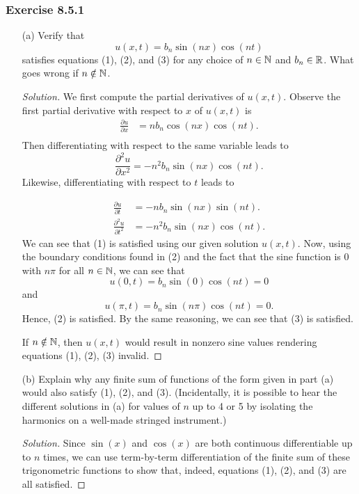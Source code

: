 \subsubsection{Exercise 8.5.1} 
\begin{enumerate}
    \item[(a)] Verify that 
        \[  u(x,t) = b_{n} \sin(nx) \cos(nt) \] satisfies equations (1), (2), and (3) for any choice of \( n \in \mathbb{N}  \) and \( b_{n} \in \mathbb{R}  \). What goes wrong if \( n \notin \mathbb{N}  \).
        \begin{proof}[Solution]
        We first compute the partial derivatives of \( u(x,t)  \). Observe the first partial derivative with respect to \( x  \) of \( u(x,t) \) is 
        \begin{align*}
            \frac{\partial u }{\partial x } &= n b_{n} \cos(nx) \cos(nt). \\
        \end{align*}
        Then differentiating with respect to the same variable leads to 
        \[  \frac{\partial ^{2} u  }{\partial x^{2} } = - n^{2} b_{n} \sin(nx) \cos(nt).  \] 
        Likewise, differentiating with respect to \( t  \) leads to 

        \begin{align*}
            \frac{\partial u }{\partial t } &= -n b_{n} \sin(nx) \sin(nt). \\
            \frac{\partial ^{2} u  }{\partial  t^{2} } &= - n^{2} b_{n} \sin(nx) \cos(nt).
        \end{align*}
        We can see that (1) is satisfied using our given solution \( u(x,t) \).
        Now, using the boundary conditions found in (2) and the fact that the sine function is 0 with \( n \pi  \) for all \( n \in \mathbb{N}  \), we can see that 
        \[  u(0,t) =  b_{n} \sin(0) \cos(nt) = 0  \]
        and 
        \[  u(\pi, t ) = b_{n} \sin(n \pi ) \cos(nt) = 0. \] Hence, (2) is satisfied. By the same reasoning, we can see that (3) is satisfied.

        If \( n \notin \mathbb{N} \), then \( u(x,t)  \) would result in nonzero sine values rendering equations (1), (2), (3) invalid.
        \end{proof}
    \item[(b)] Explain why any finite sum of functions of the form given in part (a) would also satisfy (1), (2), and (3). (Incidentally, it is possible to hear the different solutions in (a) for values of \( n  \) up to 4 or 5 by isolating the harmonics on a well-made stringed instrument.)
        \begin{proof}[Solution]
        Since \( \sin(x) \) and \( \cos(x) \) are both continuous differentiable up to \( n  \) times, we can use term-by-term differentiation of the finite sum of these trigonometric functions to show that, indeed, equations (1), (2), and (3) are all satisfied.
        \end{proof}
\end{enumerate}

